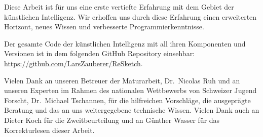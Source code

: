 Diese Arbeit ist für uns eine erste vertiefte Erfahrung mit dem Gebiet der
künstlichen Intelligenz. Wir erhoffen uns durch diese Erfahrung einen
erweiterten Horizont, neues Wissen und verbesserte Programmierkenntnisse.

Der gesamte Code der künstlichen Intelligenz mit all ihren Komponenten und Versionen ist in dem folgenden
GitHub Repository einsehbar:
\url{https://github.com/LarsZauberer/ReSketch}.

    
Vielen Dank an unseren Betreuer der Maturarbeit, Dr.\ Nicolas Ruh und an unseren
Experten im Rahmen des nationalen Wettbewerbs von Schweizer Jugend Forscht, Dr.\
Michael Tschannen, für die hilfreichen Vorschläge, die ausgeprägte Beratung und
das an uns weitergegebene technische Wissen. Vielen Dank auch an Dieter Koch für
die Zweitbeurteilung und an Günther Wasser für das Korrekturlesen dieser Arbeit.


